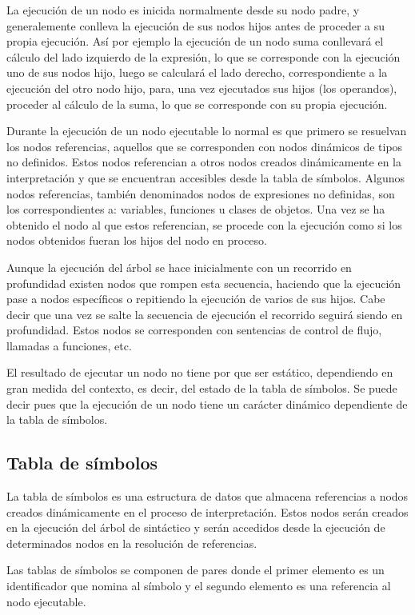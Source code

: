 La ejecución de un nodo es inicida normalmente desde su nodo padre, y generalemente conlleva la ejecución de sus nodos hijos antes de proceder a su propia ejecución. Así por ejemplo 
la ejecución de un nodo suma conllevará el cálculo del lado izquierdo de la expresión, lo que se corresponde con la ejecución uno de sus nodos hijo, luego se calculará
el lado derecho, correspondiente a la ejecución del otro nodo hijo, para, una vez ejecutados sus hijos (los operandos), proceder al cálculo de la suma, lo que se corresponde 
con su propia ejecución. 

Durante la ejecución de un nodo ejecutable lo normal es que primero se resuelvan los nodos referencias, aquellos que se corresponden con nodos dinámicos de tipos no definidos. Estos 
nodos referencian a otros nodos creados dinámicamente en la interpretación y que se encuentran accesibles desde la tabla de símbolos. Algunos nodos referencias, 
también denominados nodos de expresiones no definidas, son los correspondientes a: variables, funciones u clases de objetos. Una vez se ha obtenido el nodo al que estos referencian, 
se procede con la ejecución como si los nodos obtenidos fueran los hijos del nodo en proceso.

Aunque la ejecución del árbol se hace inicialmente con un recorrido en profundidad existen nodos que rompen esta secuencia, haciendo que la ejecución pase a nodos específicos 
o repitiendo la ejecución de varios de sus hijos. Cabe decir que una vez se salte la secuencia de ejecución el recorrido seguirá siendo en profundidad. Estos nodos 
se corresponden con sentencias de control de flujo, llamadas a funciones, etc.

El resultado de ejecutar un nodo no tiene por que ser estático, dependiendo en gran medida del contexto, es decir, del estado de la tabla de símbolos. Se puede decir pues que la 
ejecución de un nodo tiene un carácter dinámico dependiente de la tabla de símbolos.

\subsection{Tabla de símbolos}
La tabla de símbolos es una estructura de datos que almacena referencias a nodos creados dinámicamente en el proceso de interpretación. Estos nodos serán creados en la 
ejecución del árbol de sintáctico y serán accedidos desde la ejecución de determinados nodos en la resolución de referencias. 

Las tablas de símbolos se componen de pares donde el primer elemento es un identificador que nomina al símbolo y el segundo elemento es una referencia al nodo ejecutable. 


